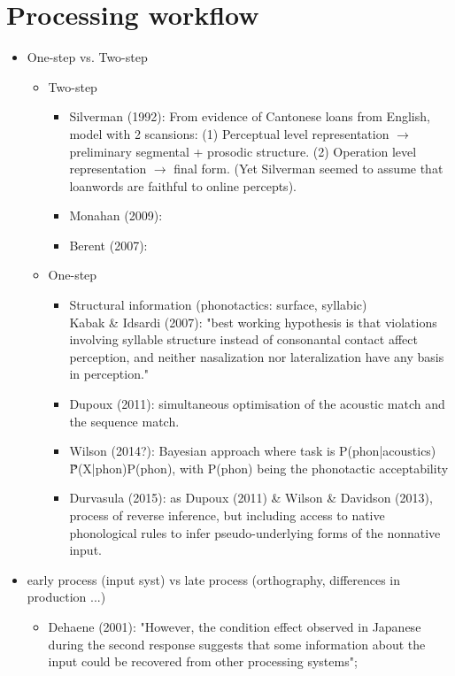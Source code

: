 \section{Processing workflow}
\begin{itemize}
\item One-step vs. Two-step
  \begin{itemize}
  \item Two-step
      \begin{itemize}
        \item Silverman (1992): From evidence of Cantonese loans from English, model with 2 scansions: (1) Perceptual level representation $\rightarrow$ preliminary segmental + prosodic structure. (2) Operation level representation $\rightarrow$ final form. (Yet Silverman seemed to assume that loanwords are faithful to online percepts).
        \item Monahan (2009):
        \item Berent (2007): 
      \end{itemize}
  \item One-step
      \begin{itemize}
      \item Structural information (phonotactics: surface, syllabic) \\
  Kabak \& Idsardi (2007): "best working hypothesis is that violations involving syllable structure instead of consonantal contact affect perception, and neither nasalization nor lateralization have any basis in perception."
         \item Dupoux (2011): simultaneous optimisation of the acoustic match and the sequence match.
         \item Wilson (2014?): Bayesian approach where task is P(phon|acoustics) \~ P(X|phon)P(phon), with P(phon) being the phonotactic acceptability 
         \item Durvasula (2015): as Dupoux (2011) \& Wilson \& Davidson (2013), process of reverse inference, but including access to native phonological rules to infer pseudo-underlying forms of the nonnative input.
      \end{itemize}  
  \end{itemize}
\item early process (input syst) vs late process (orthography, differences in production ...)
  \begin{itemize}
     \item Dehaene (2001): "However, the condition effect observed in Japanese during the second response suggests that some information about the input could be recovered from other processing systems";
  \end{itemize}  
\end{itemize}

